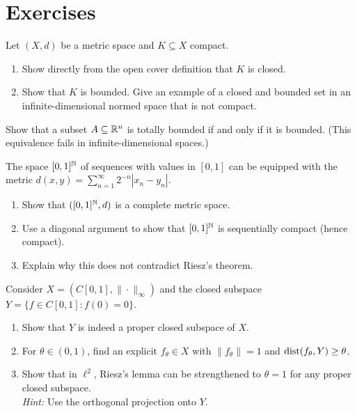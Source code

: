 \documentclass[11pt,a4paper]{article}
\begin{document}
\section{Exercises}
\label{sec:exercises}

\begin{exercise}
\label{ex:compact_closed}
Let $(X,d)$ be a metric space and $K \subseteq X$ compact.
\begin{enumerate}[label=(\alph*),nosep]
    \item Show directly from the open cover definition that $K$ is closed.
    \item Show that $K$ is bounded. Give an example of a closed and bounded
          set in an infinite-dimensional normed space that is not compact.
\end{enumerate}
\end{exercise}

\begin{exercise}
\label{ex:tb_Rn}
Show that a subset $A \subseteq \mathbb{R}^n$ is totally bounded if and only if it
is bounded. (This equivalence fails in infinite-dimensional spaces.)
\end{exercise}

\begin{exercise}
\label{ex:product_compact}
The space $[0,1]^{\mathbb{N}}$ of sequences with values in $[0,1]$ can be equipped
with the metric $d(x,y) = \sum_{n=1}^\infty 2^{-n} |x_n - y_n|$.
\begin{enumerate}[label=(\alph*),nosep]
    \item Show that $([0,1]^{\mathbb{N}}, d)$ is a complete metric space.
    \item Use a diagonal argument to show that $[0,1]^{\mathbb{N}}$ is sequentially
          compact (hence compact).
    \item Explain why this does not contradict Riesz's theorem.
\end{enumerate}
\end{exercise}

\begin{exercise}
\label{ex:riesz_sharp}
Consider $X = (C[0,1], \|\cdot\|_\infty)$ and the closed subspace
$Y = \{f \in C[0,1] : f(0) = 0\}$.
\begin{enumerate}[label=(\alph*),nosep]
    \item Show that $Y$ is indeed a proper closed subspace of $X$.
    \item For $\theta \in (0,1)$, find an explicit $f_\theta \in X$ with
          $\|f_\theta\| = 1$ and $\operatorname{dist}(f_\theta, Y) \ge \theta$.
    \item Show that in $\ell^2$, Riesz's lemma can be strengthened to
          $\theta = 1$ for any proper closed subspace. \\
          \textit{Hint:} Use the orthogonal projection onto $Y$.
\end{enumerate}
\end{exercise}
\end{document}
